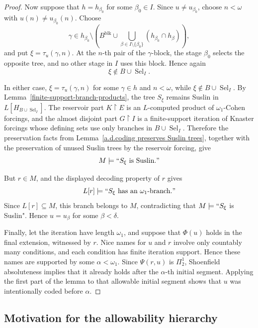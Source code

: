 \documentclass[a4paper,11pt]{article}
\begin{document}
\begin{proof}
Now suppose that $h=h_{\beta_0}$ for some $\beta_0\in I$.  Since
$u\neq u_{\beta_0}$, choose $n<\omega$ with
$u(n)\neq u_{\beta_0}(n)$.  Choose
\[
   \gamma\in h_{\beta_0}\setminus
      \left(B^{\mathrm{blk}}\cup
      \bigcup_{\beta\in I\setminus\{\beta_0\}}
         (h_{\beta_0}\cap h_\beta)
      \right),
\]
and put $\xi=\tau_u(\gamma,n)$.  At the $n$-th pair of the $\gamma$-block, the
stage $\beta_0$ selects the opposite tree, and no other stage in $I$ uses this
block.  Hence again
\[
   \xi\notin B\cup\operatorname{Sel}_I.
\]

In either case, $\xi=\tau_u(\gamma,n)$ for some $\gamma\in h$ and $n<\omega$,
while $\xi\notin B\cup\operatorname{Sel}_I$.  By
Lemma~\ref{finite-support-branch-products}, the tree $S_\xi$ remains Suslin in
$L[H_{B\cup\operatorname{Sel}_I}]$.  The reservoir part
$K\upharpoonright E$ is an $L$-computed product of $\omega_1$-Cohen forcings,
and the almost disjoint part $G\upharpoonright I$ is a finite-support
iteration of Knaster forcings whose defining sets use only branches in
$B\cup\operatorname{Sel}_I$.  Therefore the preservation facts from
Lemma~\ref{a.d.coding preserves Suslin trees}, together with the preservation
of unused Suslin trees by the reservoir forcing, give
\[
   M\models ``S_\xi\text{ is Suslin}."
\]

But $r\in M$, and the displayed decoding property of $r$ gives
\[
   L[r]\models
   ``S_\xi\text{ has an }\omega_1\text{-branch}."
\]
Since $L[r]\subseteq M$, this branch belongs to $M$, contradicting that
$M\models``S_\xi$ is Suslin".  Hence $u=u_\beta$ for some $\beta<\delta$.

Finally, let the iteration have length $\omega_1$, and suppose that
$\Phi(u)$ holds in the final extension, witnessed by $r$.  Nice names for $u$
and $r$ involve only countably many conditions, and each condition has finite
iteration support.  Hence these names are supported by some
$\alpha<\omega_1$.  Since $\Psi(r,u)$ is $\Pi^1_2$, Shoenfield absoluteness
implies that it already holds after the $\alpha$-th initial segment.  Applying
the first part of the lemma to that allowable initial segment shows that $u$
was intentionally coded before $\alpha$.
\end{proof}




\subsection{Motivation for the allowability hierarchy}
\label{subsection-motivation-allowability}
\end{document}
